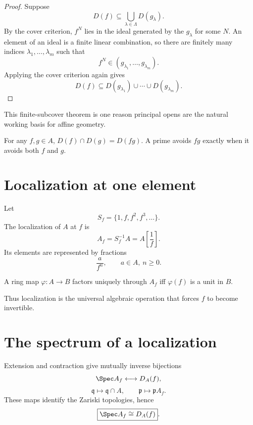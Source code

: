 \begin{proof}
Suppose
\[
D(f)\subseteq\bigcup_{\lambda\in\Lambda}D(g_\lambda).
\]
By the cover criterion, $f^N$ lies in the ideal generated by the $g_\lambda$ for some $N$.
An element of an ideal is a finite linear combination, so there are finitely many indices
$\lambda_1,\dots,\lambda_m$ such that
\[
f^N\in(g_{\lambda_1},\dots,g_{\lambda_m}).
\]
Applying the cover criterion again gives
\[
D(f)\subseteq D(g_{\lambda_1})\cup\cdots\cup D(g_{\lambda_m}).
\]
\end{proof}

This finite-subcover theorem is one reason principal opens are the natural working basis for
affine geometry.

\begin{example}\label{ex:vi08-expand-02}
For any $f,g\in A$, $D(f)\cap D(g)=D(fg)$.  A prime avoids $fg$ exactly when it avoids both $f$ and $g$.
\end{example}
\section{Localization at one element}

Let
\[
S_f=\{1,f,f^2,f^3,\dots\}.
\]
The localization of $A$ at $f$ is
\[
A_f=S_f^{-1}A=A\left[\frac1f\right].
\]
Its elements are represented by fractions
\[
\frac{a}{f^n},\qquad a\in A,\ n\ge0.
\]

\begin{proposition}
A ring map $\varphi:A\to B$ factors uniquely through $A_f$ iff $\varphi(f)$ is a unit in
$B$.
\end{proposition}

Thus localization is the universal algebraic operation that forces $f$ to become invertible.

\section{The spectrum of a localization}

\begin{theorem}
Extension and contraction give mutually inverse bijections
\[
\Spec A_f
\longleftrightarrow
D_A(f),
\]
\[
\mathfrak q\longmapsto\mathfrak q\cap A,
\qquad
\mathfrak p\longmapsto\mathfrak p A_f.
\]
These maps identify the Zariski topologies, hence
\[
\boxed{\Spec A_f\cong D_A(f)}.
\]
\end{theorem}

